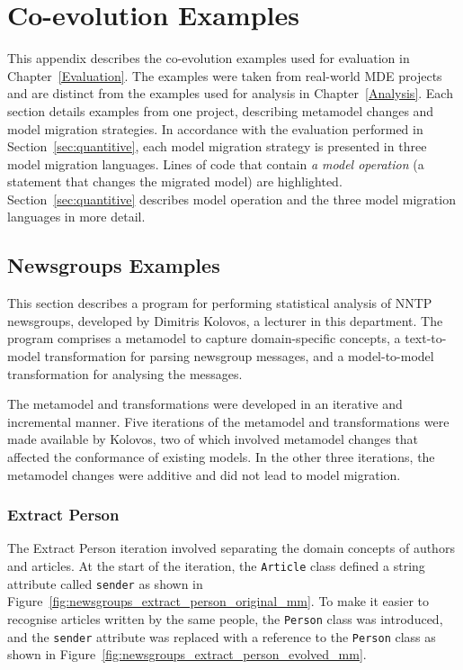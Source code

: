 \chapter{Co-evolution Examples}
\label{CoevolutionExamples}




This appendix describes the co-evolution examples used for evaluation in Chapter~\ref{Evaluation}. The examples were taken from real-world MDE projects and are distinct from the examples used for analysis in Chapter~\ref{Analysis}. Each section details examples from one project, describing metamodel changes and model migration strategies. In accordance with the evaluation performed in Section~\ref{sec:quantitive}, each model migration strategy is presented in three model migration languages. Lines of code that contain \emph{a model operation} (a statement that changes the migrated model) are highlighted. Section~\ref{sec:quantitive} describes model operation and the three model migration languages in more detail.


\section{Newsgroups Examples}
This section describes a program for performing statistical analysis of NNTP newsgroups, developed by Dimitris Kolovos, a lecturer in this department. The program comprises a metamodel to capture domain-specific concepts, a text-to-model transformation for parsing newsgroup messages, and a model-to-model transformation for analysing the messages.

The metamodel and transformations were developed in an iterative and incremental manner. Five iterations of the metamodel and transformations were made available by Kolovos, two of which involved metamodel changes that affected the conformance of existing models. In the other three iterations, the metamodel changes were additive and did not lead to model migration.

\subsection{Extract Person}
The Extract Person iteration involved separating the domain concepts of authors and articles. At the start of the iteration, the \texttt{Ar\-ti\-c\-le} class defined a string attribute called \texttt{se\-nd\-er} as shown in Figure~\ref{fig:newsgroups_extract_person_original_mm}. To make it easier to recognise articles written by the same people, the \texttt{Pe\-rs\-on} class was introduced, and the \texttt{se\-nd\-er} attribute was replaced with a reference to the \texttt{Pe\-rs\-on} class as shown in Figure~\ref{fig:newsgroups_extract_person_evolved_mm}.

